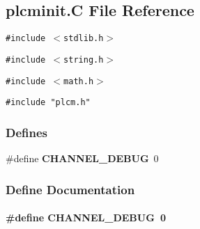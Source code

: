 \subsection{plcminit.C File Reference}
\label{plcminit.C}
{\tt \#include $<$stdlib.h$>$}\par
{\tt \#include $<$string.h$>$}\par
{\tt \#include $<$math.h$>$}\par
{\tt \#include "plcm.h"}\par
\subsubsection*{Defines}
\begin{CompactItemize}
\item 
\#define {\bf CHANNEL\_\-DEBUG}\ 0
\end{CompactItemize}


\subsubsection{Define Documentation}
\label{plcminit.C_a0}
\paragraph{\setlength{\rightskip}{0pt plus 5cm}\#define CHANNEL\_\-DEBUG\ 0}\hfill

